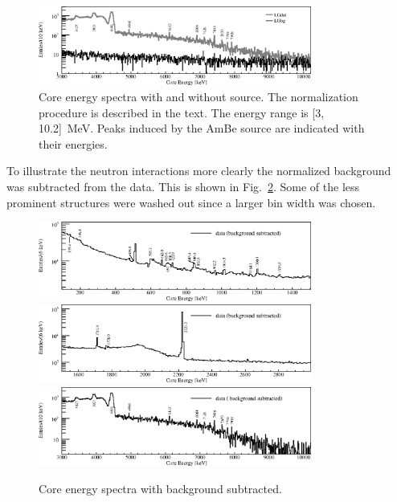 \begin{figure}[tbhp]
  \centering
  \includegraphics[width=0.8\textwidth,clip]{spectra_3_11MeV}
  \caption{Core energy spectra with and without source. The
    normalization procedure is described in the text. The energy range
    is [3, 10.2]~MeV. Peaks induced by the AmBe source are indicated
    with their energies.}
  \label{fig:neu:specl}
\end{figure}

To illustrate the neutron interactions more clearly the normalized
background was subtracted from the data. This is shown in
Fig.~\ref{fig:neu:specd}. Some of the less prominent structures were
washed out since a larger bin width was chosen.

\begin{figure}[tbhp]
  \centering
  \includegraphics[width=0.8\textwidth,clip]{spectra_0_1d5MeV}
  \includegraphics[width=0.8\textwidth,clip]{spectra_1d5_3MeV}
  \includegraphics[width=0.8\textwidth,clip]{spectra_3_10d2MeV}
  \caption{Core energy spectra with background subtracted.}
  \label{fig:neu:specd}
\end{figure}

